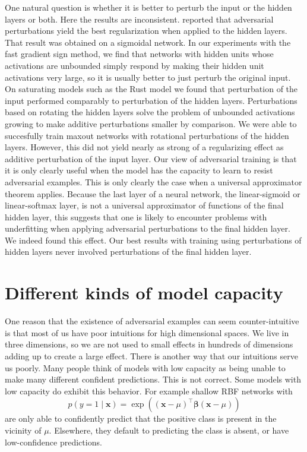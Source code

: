 \documentclass{article} %
\def\vbeta{{\bm{\beta}}}
\def\vx{{\bm{x}}}
\begin{document}
One natural question is whether it is better to perturb the input or the hidden layers or both.
Here the results are inconsistent.
\citet{Szegedy-ICLR2014} reported that adversarial perturbations yield the best regularization when applied to
the hidden layers. That result was obtained on a sigmoidal network. In our experiments with the fast gradient
sign method, we find that networks with hidden units
whose activations are unbounded simply respond by making their hidden unit activations very large, so it is
usually better to just perturb the original input. On saturating models such as the Rust model we found that
perturbation of the input performed comparably to perturbation of the hidden layers.
Perturbations based on rotating the hidden layers solve the problem of unbounded activations growing to
make additive perturbations smaller by comparison. We were able to succesfully train maxout networks with
rotational perturbations of the hidden layers. However, this did not yield nearly as strong of a regularizing
effect as additive perturbation of the input layer.
Our view of adversarial training is that it is only clearly useful when the model has the capacity to
learn to resist adversarial examples. This is only clearly the case when a universal approximator theorem
applies. Because the last layer of a neural network, the linear-sigmoid or linear-softmax layer, is not
a universal approximator of functions of the final hidden layer, this suggests that one is likely to
encounter problems with underfitting when applying
adversarial perturbations to the final hidden layer. We indeed found this effect. Our best results with
training using perturbations of hidden layers never involved perturbations of the final hidden layer.
\section{Different kinds of model capacity}
One reason that the existence of adversarial examples can seem counter-intuitive is that most
of us have poor intuitions for high dimensional spaces. We live in three dimensions, so we are
not used to small effects in hundreds of dimensions adding up to create a large effect.
There is another way that our intuitions serve us poorly. Many people think of models with low
capacity as being unable to make many different confident predictions. This is not correct.
Some models with low capacity do exhibit this behavior. For example shallow RBF networks with
\vspace{-.05in}
\[
p(y=1 \mid \vx ) = \exp \left( (\vx - \mu)^\top \vbeta (\vx - \mu) \right) \]
are only able to confidently predict that the positive class is present in the vicinity of
$\mu$. Elsewhere, they default to predicting the class is absent, or have low-confidence
predictions.
\end{document}
